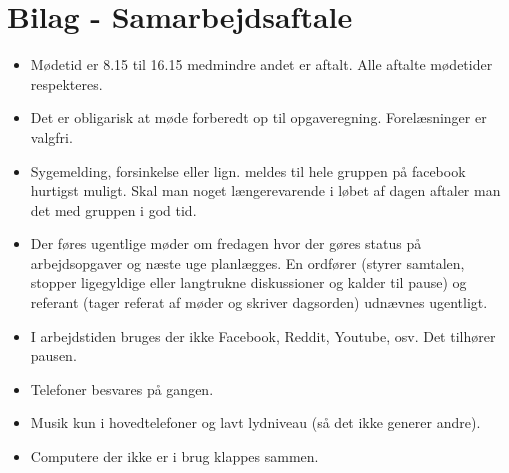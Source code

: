 \chapter{Bilag - Samarbejdsaftale}
\label{Bilag1}

\begin{itemize}
	\item Mødetid er 8.15 til 16.15 medmindre andet er aftalt. Alle aftalte mødetider respekteres.
	\item Det er obligarisk at møde forberedt op til opgaveregning. Forelæsninger er valgfri.
	\item Sygemelding, forsinkelse eller lign. meldes til hele gruppen på facebook hurtigst muligt. Skal man noget længerevarende i løbet af dagen aftaler man det med gruppen i god tid.
	\item Der føres ugentlige møder om fredagen hvor der gøres status på arbejdsopgaver og næste uge planlægges. En ordfører (styrer samtalen, stopper ligegyldige eller langtrukne diskussioner og kalder til pause) og referant (tager referat af møder og skriver dagsorden) udnævnes ugentligt.	
	\item  I arbejdstiden bruges der ikke Facebook, Reddit, Youtube, osv. Det tilhører pausen. 
	\item Telefoner besvares på gangen.
	\item Musik kun i hovedtelefoner og lavt lydniveau (så det ikke generer andre).
	\item Computere der ikke er i brug klappes sammen.
\end{itemize}
 \clearpage
